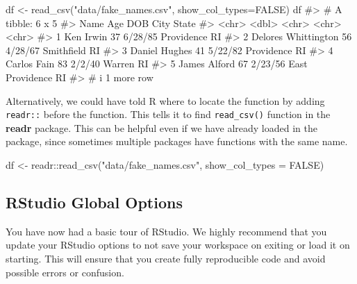 \documentclass[
  letterpaper,
]{krantz}
\makeatletter
\newenvironment{Shaded}{\begin{snugshade}}{\end{snugshade}}
\newcommand{\AttributeTok}[1]{\textcolor[rgb]{0.40,0.45,0.13}{#1}}
\newcommand{\CommentTok}[1]{\textcolor[rgb]{0.37,0.37,0.37}{#1}}
\newcommand{\ConstantTok}[1]{\textcolor[rgb]{0.56,0.35,0.01}{#1}}
\newcommand{\FunctionTok}[1]{\textcolor[rgb]{0.28,0.35,0.67}{#1}}
\newcommand{\NormalTok}[1]{\textcolor[rgb]{0.00,0.23,0.31}{#1}}
\newcommand{\OtherTok}[1]{\textcolor[rgb]{0.00,0.23,0.31}{#1}}
\newcommand{\SpecialCharTok}[1]{\textcolor[rgb]{0.37,0.37,0.37}{#1}}
\newcommand{\StringTok}[1]{\textcolor[rgb]{0.13,0.47,0.30}{#1}}
\newenvironment{kframe}{%
\medskip{}
\setlength{\fboxsep}{.8em}
 \def\at@end@of@kframe{}%
 \ifinner\ifhmode%
  \def\at@end@of@kframe{\end{minipage}}%
  \begin{minipage}{\columnwidth}%
 \fi\fi%
 \def\FrameCommand##1{\hskip\@totalleftmargin \hskip-\fboxsep
 \colorbox{shadecolor}{##1}\hskip-\fboxsep
     \hskip-\linewidth \hskip-\@totalleftmargin \hskip\columnwidth}%
 \MakeFramed {\advance\hsize-\width
   \@totalleftmargin\z@ \linewidth\hsize
   \@setminipage}}%
 {\par\unskip\endMakeFramed%
 \at@end@of@kframe}
\renewenvironment{Shaded}{\begin{kframe}}{\end{kframe}}
\makeatother
\begin{document}
\begin{Shaded}
\begin{Highlighting}[]
\NormalTok{df }\OtherTok{\textless{}{-}} \FunctionTok{read\_csv}\NormalTok{(}\StringTok{"data/fake\_names.csv"}\NormalTok{, }\AttributeTok{show\_col\_types=}\ConstantTok{FALSE}\NormalTok{)}
\NormalTok{df}
\CommentTok{\#\textgreater{} \# A tibble: 6 x 5}
\CommentTok{\#\textgreater{}   Name                  Age DOB     City            State}
\CommentTok{\#\textgreater{}   \textless{}chr\textgreater{}               \textless{}dbl\textgreater{} \textless{}chr\textgreater{}   \textless{}chr\textgreater{}           \textless{}chr\textgreater{}}
\CommentTok{\#\textgreater{} 1 Ken Irwin              37 6/28/85 Providence      RI   }
\CommentTok{\#\textgreater{} 2 Delores Whittington    56 4/28/67 Smithfield      RI   }
\CommentTok{\#\textgreater{} 3 Daniel Hughes          41 5/22/82 Providence      RI   }
\CommentTok{\#\textgreater{} 4 Carlos Fain            83 2/2/40  Warren          RI   }
\CommentTok{\#\textgreater{} 5 James Alford           67 2/23/56 East Providence RI   }
\CommentTok{\#\textgreater{} \# i 1 more row}
\end{Highlighting}
\end{Shaded}

Alternatively, we could have told R where to locate the function by
adding \texttt{readr::} before the function. This tells it to find
\texttt{read\_csv()} function in the \textbf{readr} package. This can be
helpful even if we have already loaded in the package, since sometimes
multiple packages have functions with the same name.

\begin{Shaded}
\begin{Highlighting}[]
\NormalTok{df }\OtherTok{\textless{}{-}}\NormalTok{ readr}\SpecialCharTok{::}\FunctionTok{read\_csv}\NormalTok{(}\StringTok{"data/fake\_names.csv"}\NormalTok{, }\AttributeTok{show\_col\_types =} \ConstantTok{FALSE}\NormalTok{)}
\end{Highlighting}
\end{Shaded}

\hypertarget{rstudio-global-options}{%
\subsection{RStudio Global Options}\label{rstudio-global-options}}

You have now had a basic tour of RStudio. We highly recommend that you
update your RStudio options to not save your workspace on exiting or
load it on starting. This will ensure that you create fully reproducible
code and avoid possible errors or confusion.
\end{document}
